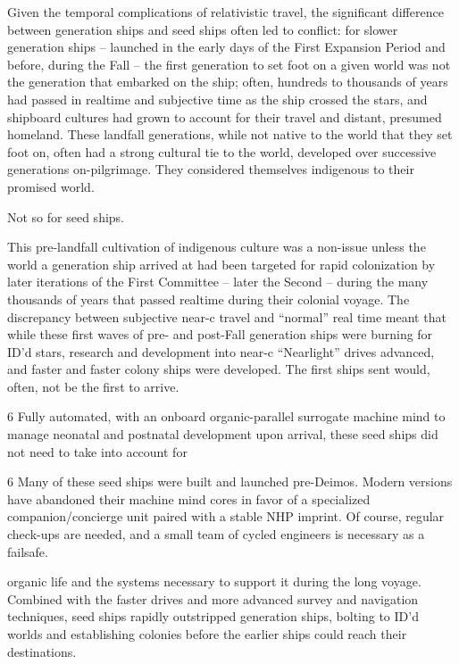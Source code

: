 Given the temporal complications of relativistic travel, the significant difference between  
generation ships and seed ships often led to conflict: for slower generation ships -- launched in  
the early days of the First Expansion Period and before, during the Fall -- the first generation to  
set foot on a given world was not the generation that embarked on the ship; often, hundreds to  
thousands of years had passed in realtime and subjective time as the ship crossed the stars, and  
shipboard cultures had grown to account for their travel and distant, presumed homeland. These  
landfall generations, while not native to the world that they set foot on, often had a strong  
cultural tie to the world, developed over successive generations on-pilgrimage. They considered  
themselves indigenous to their promised world. 
 

Not so for seed ships. 
 

This pre-landfall cultivation of indigenous culture was a non-issue unless the world a generation  
ship arrived at had been targeted for rapid colonization by later iterations of the First Committee  
-- later the Second -- during the many thousands of years that passed realtime during their  
colonial voyage. The discrepancy between subjective near-c travel and “normal” real time meant  
that while these first waves of pre- and post-Fall generation ships were burning for ID’d stars,  
research and development into near-c “Nearlight” drives advanced, and faster and faster colony  
ships were developed. The first ships sent would, often, not be the first to arrive.  
 

                                                                                          6 
Fully automated, with an onboard organic-parallel surrogate machine mind  to manage neonatal  
and postnatal development upon arrival, these seed ships did not need to take into account for  

6 Many of these seed ships were built and launched pre-Deimos. Modern versions have abandoned their  
machine mind cores in favor of a specialized companion/concierge unit paired with a stable NHP imprint. Of  
course, regular check-ups are needed, and a small team of cycled engineers is necessary as a failsafe.  

                                                                                                                 


organic life and the systems necessary to support it during the long voyage. Combined with the  
faster drives and more advanced survey and navigation techniques, seed ships rapidly  
outstripped generation ships, bolting to ID’d worlds and establishing colonies before the earlier  
ships could reach their destinations.
 

